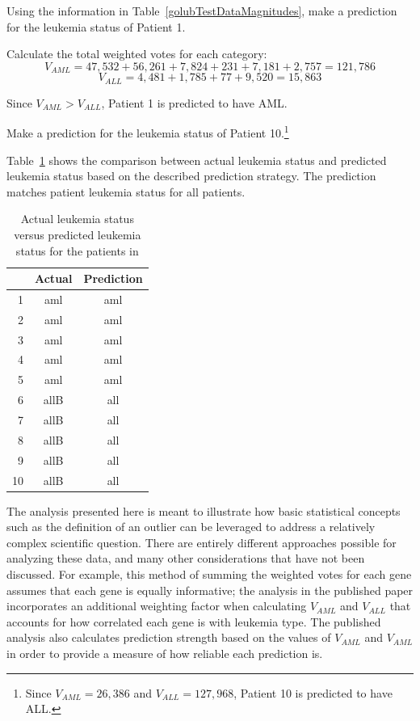 \begin{example}{Using the information in Table~\ref{golubTestDataMagnitudes}, make a prediction for the leukemia status of Patient 1.}
	
Calculate the total weighted votes for each category:
\[V_{AML} = 47,532 + 56,261 + 7,824 + 231 + 7,181 + 2,757 = 121,786 \]
\[V_{ALL} = 4,481 + 1,785 + 77 + 9,520 = 15,863 \]	

Since $V_{AML} > V_{ALL}$, Patient 1 is predicted to have AML. 	
	
\end{example}

\begin{exercise}{Make a prediction for the leukemia status of Patient 10.\footnote{Since $V_{AML} = 26,386$ and $V_{ALL} = 127,968$, Patient 10 is predicted to have ALL.}}
\end{exercise}

Table~\ref{golubActualPrediction} shows the comparison between actual leukemia status and predicted leukemia status based on the described prediction strategy. The prediction matches patient leukemia status for all patients. 

\begin{table}[ht]
	\centering
	\small
	\begin{tabular}{r|cc}
		\hline
		& Actual & Prediction \\ 
		\hline
		1 & aml & aml \\ 
		2 & aml & aml \\ 
		3 & aml & aml \\ 
		4 & aml & aml \\ 
		5 & aml & aml \\ 
		6 & allB & all \\ 
		7 & allB & all \\ 
		8 & allB & all \\ 
		9 & allB & all \\ 
		10 & allB & all \\ 
		\hline
	\end{tabular}
	\caption{Actual leukemia status versus predicted leukemia status for the patients in  \label{golubActualPrediction}}
\end{table}

The analysis presented here is meant to illustrate how basic statistical concepts such as the definition of an outlier can be leveraged to address a relatively complex scientific question. There are entirely different approaches possible for analyzing these data, and many other considerations that have not been discussed. For example, this method of summing the weighted votes for each gene assumes that each gene is equally informative; the analysis in the published paper incorporates an additional weighting factor when calculating $V_{AML}$ and $V_{ALL}$ that accounts for how correlated each gene is with leukemia type. The published analysis also calculates prediction strength based on the values of $V_{AML}$ and $V_{AML}$ in order to provide a measure of how reliable each prediction is. 

